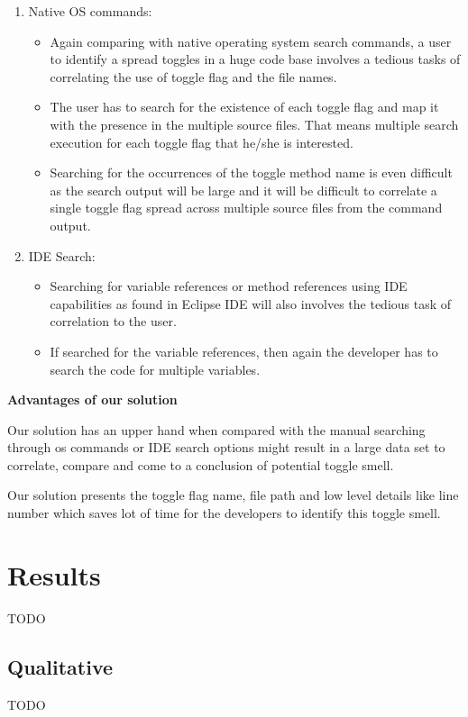 \documentclass[conference]{IEEEtran}
\begin{document}
\begin{enumerate}
\item{Native OS commands:

\begin{itemize}
\item Again comparing with native operating system search commands, a user to identify a spread toggles in a huge code base involves a tedious tasks of correlating the use of toggle flag and the file names.
\item The user has to search for the existence of each toggle flag and map it with the presence in the multiple source files. That means multiple search execution for each toggle flag that he/she is interested.
\item Searching for the occurrences of the toggle method name is even difficult as the search output will be large and it will be difficult to correlate a single toggle flag spread across multiple source files from the command output.
\end{itemize}
}

\item{IDE Search:
\begin{itemize}
\item Searching for variable references or method references using IDE capabilities as found in Eclipse IDE will also involves the tedious task of correlation to the user.
\item If searched for the variable references, then again the developer has to search the code for multiple variables.
\end{itemize}
}
\end{enumerate}

\textbf{Advantages of our solution}

Our solution has an upper hand when compared with the manual searching through os commands or IDE search options might result in a large data set to correlate, compare and come to a conclusion of potential toggle smell.

Our solution presents the toggle flag name, file path and low level details like line number which saves lot of time for the developers to identify this toggle smell.

\section{Results}
\label{threats}
TODO
\subsection{Qualitative}
TODO
\end{document}

